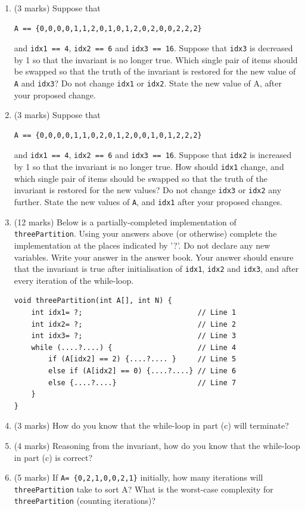 \documentclass[twoside=false,DIV=14]{scrartcl}
\begin{document}
\begin{enumerate}
\item (3 marks) Suppose that 
\begin{verbatim}
A == {0,0,0,0,1,1,2,0,1,0,1,2,0,2,0,0,2,2,2}
\end{verbatim}
and \verb+idx1 == 4+, \verb+idx2 == 6+ and \verb+idx3 == 16+. Suppose that \verb+idx3+ is decreased by 1 so that the invariant is no longer true. Which single pair of items should be swapped so that the truth of the invariant is restored for the new value of \verb+A+ and \verb+idx3+? Do not change \verb+idx1+ or \verb+idx2+. State the new value of A, after your proposed change.
\item (3 marks) Suppose that 
\begin{verbatim}
A == {0,0,0,0,1,1,0,2,0,1,2,0,0,1,0,1,2,2,2}
\end{verbatim}
and \verb+idx1 == 4+, \verb+idx2 == 6+ and \verb+idx3 == 16+. Suppose that \verb+idx2+ is increased by 1 so that the invariant is no longer true. How should \verb+idx1+ change, and which single pair of items should be swapped so that the truth of the invariant is restored for the new values? Do not change \verb+idx3+ or \verb+idx2+ any further. State the new values of \verb+A+, and \verb+idx1+ after your proposed changes.
\item (12 marks) Below is a partially-completed implementation of \verb+threePartition+. Using your answers above (or otherwise) complete the implementation at the places indicated by '?'. Do not declare any new variables. Write your answer in the answer book. Your answer should ensure that the invariant is true after initialisation of \verb+idx1+, \verb+idx2+ and \verb+idx3+, and after every iteration of the while-loop.
\begin{lstlisting}
void threePartition(int A[], int N) {
    int idx1= ?;                           // Line 1
    int idx2= ?;                           // Line 2
    int idx3= ?;                           // Line 3
    while (....?....) {                    // Line 4
        if (A[idx2] == 2) {....?.... }     // Line 5
        else if (A[idx2] == 0) {....?....} // Line 6
        else {....?....}                   // Line 7
    }
}
\end{lstlisting}
\item (3 marks) How do you know that the while-loop in part (c) will terminate?
\item (4 marks) Reasoning from the invariant, how do you know that the while-loop in part (c) is correct?
\item (5 marks) If \verb+A= {0,2,1,0,0,2,1}+ initially, how many iterations will \verb+threePartition+ take to sort A? What is the worst-case complexity for \verb+threePartition+ (counting iterations)?
\end{enumerate}
 
\end{document}
